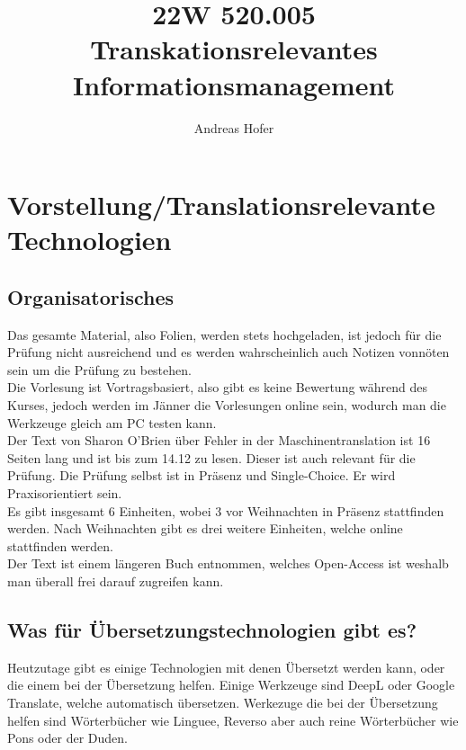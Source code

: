 \documentclass{article}
\title{\vspace{-2cm}22W 520.005 Transkationsrelevantes Informationsmanagement}
\author{Andreas Hofer}
\begin{document}
	\maketitle
	\section{Vorstellung/Translationsrelevante Technologien}
	\subsection{Organisatorisches}
	Das gesamte Material, also Folien, werden stets hochgeladen, ist jedoch für die Prüfung nicht ausreichend und es werden wahrscheinlich auch Notizen vonnöten sein um die Prüfung zu bestehen. \\
	Die Vorlesung ist Vortragsbasiert, also gibt es keine Bewertung während des Kurses, jedoch werden im Jänner die Vorlesungen online sein, wodurch man die Werkzeuge gleich am PC testen kann. \\
	Der Text von Sharon O'Brien über Fehler in der Maschinentranslation ist 16 Seiten lang und ist bis zum 14.12 zu lesen. Dieser ist auch relevant für die Prüfung. Die Prüfung selbst ist in Präsenz und Single-Choice. Er wird Praxisorientiert sein. \\
	Es gibt insgesamt 6 Einheiten, wobei 3 vor Weihnachten in Präsenz stattfinden werden. Nach Weihnachten gibt es drei weitere Einheiten, welche online stattfinden werden. \\
	Der Text ist einem längeren Buch entnommen, welches Open-Access ist weshalb man überall frei darauf zugreifen kann. \\
	\subsection{Was für Übersetzungstechnologien gibt es?}
	Heutzutage gibt es einige Technologien mit denen Übersetzt werden kann, oder die einem bei der Übersetzung helfen. Einige Werkzeuge sind DeepL oder Google Translate, welche automatisch übersetzen. Werkezuge die bei der Übersetzung helfen sind Wörterbücher wie Linguee, Reverso aber auch reine Wörterbücher wie Pons oder der Duden.
\end{document}
